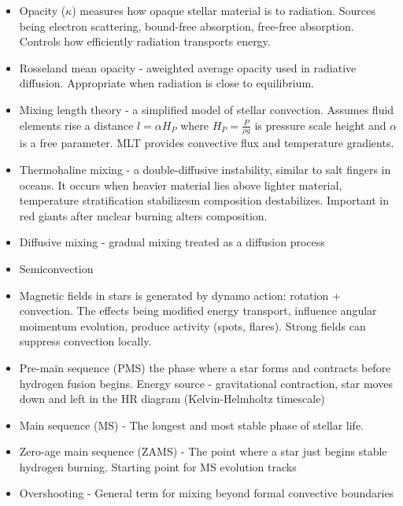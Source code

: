 \begin{itemize}
    \item Opacity ($\kappa$) measures how opaque stellar material is to radiation. Sources being electron scattering, bound-free absorption, free-free absorption. Controls how efficiently radiation transports energy.
    
    \item Rosseland mean opacity -  aweighted average opacity used in radiative diffusion. Appropriate when radiation is close to equilibrium.
    
    \item Mixing length theory - a simplified model of stellar convection. Assumes fluid elements rise a distance $l = \alpha H_{P}$ where $H_P = \frac{P}{\rho g}$ is pressure scale height and $\alpha$ is a free parameter. MLT provides convective flux and temperature gradients.
    
    \item Thermohaline mixing - a double-diffusive instability, similar to salt fingers in oceans. It occurs when heavier material lies above lighter material, temperature stratification stabilizesm composition destabilizes. Important in red giants after nuclear burning alters composition.
    
    \item Diffusive mixing - gradual mixing treated as a diffusion process
    
    \item Semiconvection
    
    \item Magnetic fields in stars is generated by dynamo action: rotation + convection. The effects being modified energy transport, influence angular moimentum evolution, produce activity (spots, flares). Strong fields can suppress convection locally.
    
    \item Pre-main sequence (PMS) the phase where a star forms and contracts before hydrogen fusion begins. Energy source - gravitational contraction, star moves down and left in the HR diagram (Kelvin-Helmholtz timescale)
    
    \item Main sequence (MS) - The longest and most stable phase of stellar life.
    
    \item Zero-age main sequence (ZAMS) - The point where a star just begins stable hydrogen burning. Starting point for MS evolution tracks
    
    \item Overshooting - General term for mixing beyond formal convective boundaries
\end{itemize}